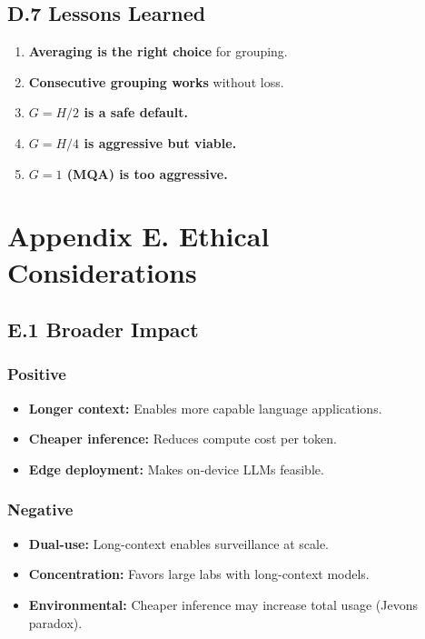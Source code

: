 \subsection{D.7 Lessons Learned}

\begin{enumerate}
\item \textbf{Averaging is the right choice} for grouping.
\item \textbf{Consecutive grouping works} without loss.
\item \textbf{$G = H/2$ is a safe default.}
\item \textbf{$G = H/4$ is aggressive but viable.}
\item \textbf{$G = 1$ (MQA) is too aggressive.}
\end{enumerate}


\section{Appendix E. Ethical Considerations}

\subsection{E.1 Broader Impact}

\subsubsection{Positive}
\begin{itemize}
\item \textbf{Longer context:} Enables more capable language applications.
\item \textbf{Cheaper inference:} Reduces compute cost per token.
\item \textbf{Edge deployment:} Makes on-device LLMs feasible.

\end{itemize}
\subsubsection{Negative}
\begin{itemize}
\item \textbf{Dual-use:} Long-context enables surveillance at scale.
\item \textbf{Concentration:} Favors large labs with long-context models.
\item \textbf{Environmental:} Cheaper inference may increase total usage (Jevons paradox).

\end{itemize}
